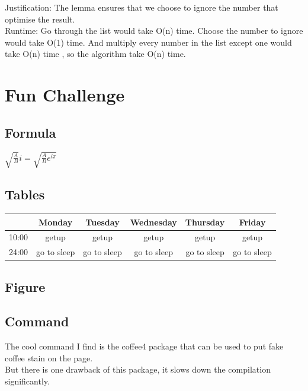 \documentclass[12pt]{article}
\begin{document}
Justification: The lemma ensures that we choose to ignore the number that optimise the result.\\

Runtime: Go through the list would take O(n) time. Choose the number to ignore would take O(1) time. And multiply every number in the list except one would take O(n) time , so the algorithm take O(n) time.


\pagebreak

\section{Fun Challenge}
\subsection{Formula}
\begin{center}
$\sqrt{\frac{A}{B}}i = \sqrt{\frac{A}{B}e^{i\pi}}$
\end{center}

\subsection{Tables}
\begin{tabular}{|c | c | c | c | c | c|}
\hline
& Monday & Tuesday & Wednesday & Thursday & Friday\\
\hline
10:00&getup&getup&getup & getup & getup\\
\hline
24:00&go to sleep&go to sleep&go to sleep&go to sleep&go to sleep\\
\hline
\end{tabular}

\subsection{Figure}

\subsection{Command} 

\noindent The cool command I find is the coffee4 package that can be used to put fake coffee stain on the page.\\
But there is one drawback of this package, it slows down the compilation significantly.
\end{document}
